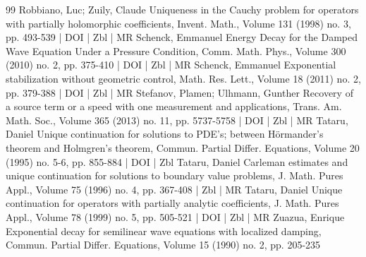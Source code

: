 \begin{thebibliography}{99}
Robbiano, Luc; Zuily, Claude Uniqueness in the Cauchy problem for operators with partially holomorphic coefficients, Invent. Math., Volume 131 (1998) no. 3, pp. 493-539 | DOI | Zbl | MR
Schenck, Emmanuel Energy Decay for the Damped Wave Equation Under a Pressure Condition, Comm. Math. Phys., Volume 300 (2010) no. 2, pp. 375-410 | DOI | Zbl | MR
Schenck, Emmanuel Exponential stabilization without geometric control, Math. Res. Lett., Volume 18 (2011) no. 2, pp. 379-388 | DOI | Zbl | MR
Stefanov, Plamen; Ulhmann, Gunther Recovery of a source term or a speed with one measurement and applications, Trans. Am. Math. Soc., Volume 365 (2013) no. 11, pp. 5737-5758 | DOI | Zbl | MR
Tataru, Daniel Unique continuation for solutions to PDE’s; between Hörmander’s theorem and Holmgren’s theorem, Commun. Partial Differ. Equations, Volume 20 (1995) no. 5-6, pp. 855-884 | DOI | Zbl
Tataru, Daniel Carleman estimates and unique continuation for solutions to boundary value problems, J. Math. Pures Appl., Volume 75 (1996) no. 4, pp. 367-408 | Zbl | MR
Tataru, Daniel Unique continuation for operators with partially analytic coefficients, J. Math. Pures Appl., Volume 78 (1999) no. 5, pp. 505-521 | DOI | Zbl | MR
Zuazua, Enrique Exponential decay for semilinear wave equations with localized damping, Commun. Partial Differ. Equations, Volume 15 (1990) no. 2, pp. 205-235
\end{thebibliography}
